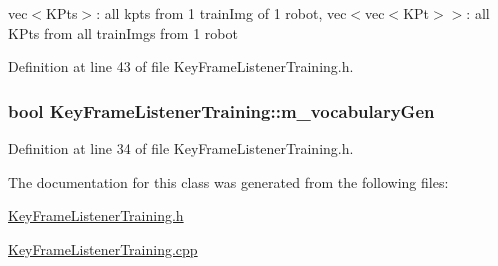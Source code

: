 vec$<$\-K\-Pts$>$\-: all kpts from 1 train\-Img of 1 robot, vec$<$vec$<$\-K\-Pt$>$$>$\-: all \-K\-Pts from all train\-Imgs from 1 robot 



\-Definition at line 43 of file \-Key\-Frame\-Listener\-Training.\-h.

\hypertarget{classKeyFrameListenerTraining_ab9a3dd6c3e61b1ac6271d891bddbd037}{
\subsubsection[{m\-\_\-vocabulary\-Gen}]{\setlength{\rightskip}{0pt plus 5cm}bool {\bf \-Key\-Frame\-Listener\-Training\-::m\-\_\-vocabulary\-Gen}}}\label{classKeyFrameListenerTraining_ab9a3dd6c3e61b1ac6271d891bddbd037}


\-Definition at line 34 of file \-Key\-Frame\-Listener\-Training.\-h.



\-The documentation for this class was generated from the following files\-:\begin{DoxyCompactItemize}
\item 
\hyperlink{KeyFrameListenerTraining_8h}{\-Key\-Frame\-Listener\-Training.\-h}\item 
\hyperlink{KeyFrameListenerTraining_8cpp}{\-Key\-Frame\-Listener\-Training.\-cpp}\end{DoxyCompactItemize}
